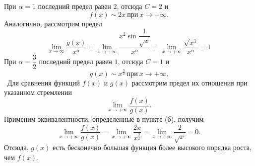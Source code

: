 При $\alpha=1$ последний предел равен $2$, отсюда $C=2$ и 
$$
f(x)\sim 2x~\text{при}~x\rightarrow+\infty.
$$
Аналогично, рассмотрим предел
$$
\lim\limits_{x\rightarrow\infty}\dfrac{g(x)}{x^{\alpha}} = 
\lim\limits_{x\rightarrow+\infty}\dfrac{x^2\sin\dfrac{1}{\sqrt{x}}}{x^\alpha} =
\lim\limits_{x\rightarrow+\infty}\dfrac{\sqrt {x^3}}{x^\alpha}=1
$$
При $\alpha=\dfrac 32$ последний предел равен $1$, отсюда $C=1$ и
$$
g(x)\sim x^{\frac 32}~\text{при}~x\rightarrow+\infty.
$$
~Для сравнения функций $f(x)$ и $g(x)$ рассмотрим предел их отношения при указанном стремлении
$$
\lim\limits_{x\rightarrow+\infty}\dfrac{f(x)}{g(x)}.
$$
Применим эквивалентности, определенные в пункте (б), получим
$$
\lim\limits_{x\rightarrow+\infty}\dfrac{f(x)}{g(x)} = 
\lim\limits_{x\rightarrow+\infty}\dfrac{2x}{x^\frac 32} = 
\lim\limits_{x\rightarrow+\infty} \dfrac{2}{\sqrt x} = 0.  
$$
Отсюда, $g(x)$ есть бесконечно большая функция более высокого порядка роста, чем $f(x)$.

